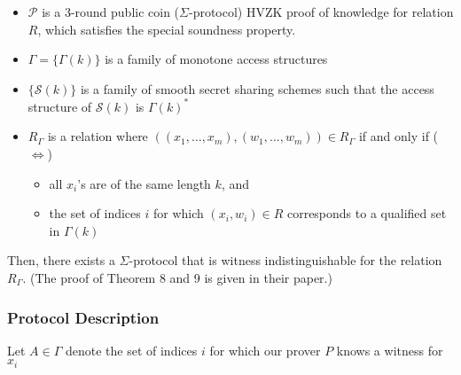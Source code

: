 \begin{itemize}
    \item $\mathcal P$ is a 3-round public coin ($\Sigma$-protocol) HVZK proof of knowledge for relation $R$, which satisfies the special soundness property.
    \item $\Gamma = \{ \Gamma(k) \}$ is a family of monotone access structures
    \item $\{\mathcal S(k)\}$ is a family of smooth secret sharing schemes such that the access structure of $\mathcal S(k)$ is $\Gamma(k)^*$
    \item $R_\Gamma$ is a relation where $((x_1,\ldots,x_m),(w_1,\ldots,w_m)) \in R_\Gamma$ if and only if ($\iff$)
    \begin{itemize}
        \item all $x_i$'s are of the same length $k$, and 
        \item the set of indices $i$ for which $(x_i,w_i) \in R$ corresponds to a qualified set in $\Gamma(k)$
    \end{itemize}
\end{itemize}

Then, there exists a $\Sigma$-protocol that is witness indistinguishable for the relation $R_\Gamma$. (The proof of Theorem 8 and 9 is given in their paper.)

\subsubsection{Protocol Description}
Let $A \in \Gamma$ denote the set of indices $i$ for which our prover $P$ knows a witness for $x_i$

